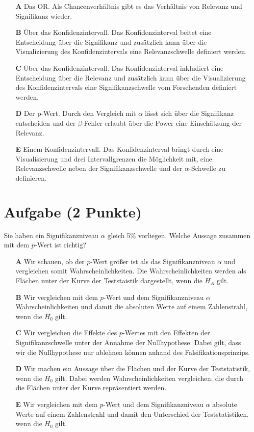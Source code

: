 \documentclass[a4paper, 9pt]{scrartcl}\usepackage[]{graphicx}\usepackage[]{xcolor}
\begin{document}
\begin{enumerate}
\item [\textbf{A} \msquare] Das OR. Als Chancenverhältnis gibt es das Verhältnis von Relevanz und Signifikanz wieder.
\item [\textbf{B} \msquare] Über das Konfidenzintervall. Das Konfidenzinterval beitet eine Entscheidung über die Signifikanz und zusätzlich kann über die Visualizierung des Konfidenzintervals eine Relevanzschwelle definiert werden.
\item [\textbf{C} \msquare] Über das Konfidenzintervall. Das Konfidenzinterval inkludiert eine Entscheidung über die Relevanz und zusätzlich kann über die Visualizierung des Konfidenzintervals eine Signifikanzschwelle vom Forschenden definiert werden.
\item [\textbf{D} \msquare] Der p-Wert. Durch den Vergleich mit $\alpha$ lässt sich über die Signifikanz entscheiden und der $\beta$-Fehler erlaubt über die Power eine Einschätzung der Relevanz.
\item [\textbf{E} \msquare] Einem Konfidenzintervall. Das Konfidenzinterval bringt durch eine Visualisierung und drei Intervallgrenzen die Möglichkeit mit, eine Relevanzschwelle neben der Signifikanzschwelle und der $\alpha$-Schwelle zu definieren.
\end{enumerate}

\section{Aufgabe \hfill (2 Punkte)}



Sie haben ein Signifikanzniveau $\alpha$ gleich 5\% vorliegen. Welche Aussage zusammen mit dem $p$-Wert ist richtig?



\begin{enumerate}
\item [\textbf{A} \msquare] Wir schauen, ob der $p$-Wert größer ist als das Signifikanzniveau $\alpha$ und vergleichen somit Wahrscheinlichkeiten. Die Wahrscheinlichkeiten werden als Flächen unter der Kurve der Teststaistik dargestellt, wenn die $H_A$ gilt.
\item [\textbf{B} \msquare] Wir vergleichen mit dem $p$-Wert und dem Signifikanzniveau $\alpha$ Wahrscheinlichkeiten und damit die absoluten Werte auf einem Zahlenstrahl, wenn die $H_0$ gilt.
\item [\textbf{C} \msquare] Wir vergleichen die Effekte des $p$-Wertes mit den Effekten der Signifikanzschwelle unter der Annahme der Nullhypothese. Dabei gilt, dass wir die Nullhypothese nur ablehnen können anhand des Falsifikationsprinzips.
\item [\textbf{D} \msquare] Wir machen ein Aussage über die Flächen und der Kurve der Teststatistik, wenn die $H_0$ gilt. Dabei werden Wahrscheinlichkeiten vergleichen, die durch die Flächen unter der Kurve repräsentiert werden.
\item [\textbf{E} \msquare] Wir vergleichen mit dem $p$-Wert und dem Signifikanzniveau $\alpha$ absolute Werte auf einem Zahlenstrahl und damit den Unterschied der Teststatistiken, wenn die $H_0$ gilt.
\end{enumerate}
\end{document}
